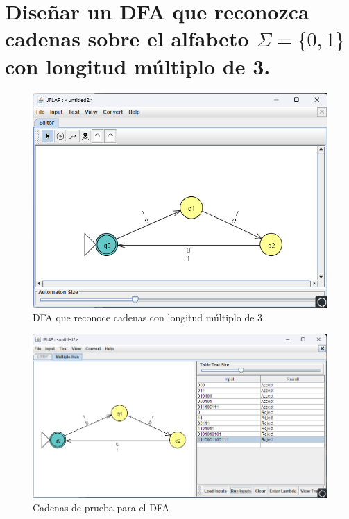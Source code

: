 \documentclass[11pt]{report}
\begin{document}
\section{Diseñar un DFA que reconozca cadenas sobre el alfabeto $\Sigma = \{0, 1\}$ con longitud múltiplo de 3.}
\begin{figure}[H]
  \centering
  \includegraphics[scale=0.6]{img/DFA_08.png}
  \caption{DFA que reconoce cadenas con longitud múltiplo de 3}
\end{figure}

\begin{figure}[H]
  \centering
  \includegraphics[scale=0.65]{img/DFA_08_test.png}
  \caption{Cadenas de prueba para el DFA}
\end{figure}

\newpage
\end{document}

